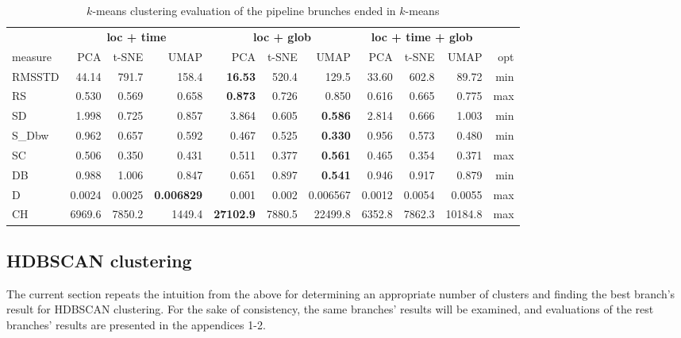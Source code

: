 \begin{table}
\begin{center}
\small
\begin{tabular}{lrrrrrrrrrr}
\hline
\multicolumn{1}{l}{ } & \multicolumn{3}{c}{\textbf{loc + time}} & \multicolumn{3}{c}{\textbf{loc + glob}} & \multicolumn{3}{c}{\textbf{loc + time + glob}} \\
\cline{1-1} \cline{2-4} \cline{5-7} \cline{8-10} 
measure & PCA & t-SNE & UMAP & PCA & t-SNE & UMAP & PCA & t-SNE & UMAP & opt\\
\hline
RMSSTD & 44.14 & 791.7 & 158.4 & \textbf{16.53} & 520.4 & 129.5 & 33.60 & 602.8 & 89.72 & min \\
RS     & 0.530 & 0.569 & 0.658 & \textbf{0.873}  & 0.726   & 0.850  & 0.616 & 0.665 & 0.775 & max \\
SD     & 1.998 & 0.725 & 0.857 & 3.864  & 0.605   & \textbf{0.586}  & 2.814 & 0.666 & 1.003 & min \\
S\_Dbw & 0.962 & 0.657 & 0.592 & 0.467  & 0.525   & \textbf{0.330}  & 0.956 & 0.573 & 0.480 & min \\
SC     & 0.506 & 0.350 & 0.431 & 0.511  & 0.377   & \textbf{0.561}  & 0.465 & 0.354 & 0.371 & max \\
DB     & 0.988 & 1.006 & 0.847 & 0.651  & 0.897   & \textbf{0.541}  & 0.946 & 0.917 & 0.879 & min \\
D      & 0.0024 & 0.0025 & \textbf{0.006829} & 0.001  & 0.002 & 0.006567 & 0.0012 & 0.0054 & 0.0055 & max \\
CH     & 6969.6 & 7850.2 & 1449.4 & \textbf{27102.9} & 7880.5 & 22499.8 & 6352.8 & 7862.3 & 10184.8 & max \\
\hline
\end{tabular}
\caption {$k$-means clustering evaluation of the pipeline brunches ended in $k$-means}
\label{tab:tab5}
\end{center}
\end {table}

\subsection{HDBSCAN clustering}

The current section repeats the intuition from the above for determining an appropriate number of clusters and finding the best branch's result for HDBSCAN clustering. For the sake of consistency, the same branches' results will be examined, and evaluations of the rest branches' results are presented in the appendices 1-2.

